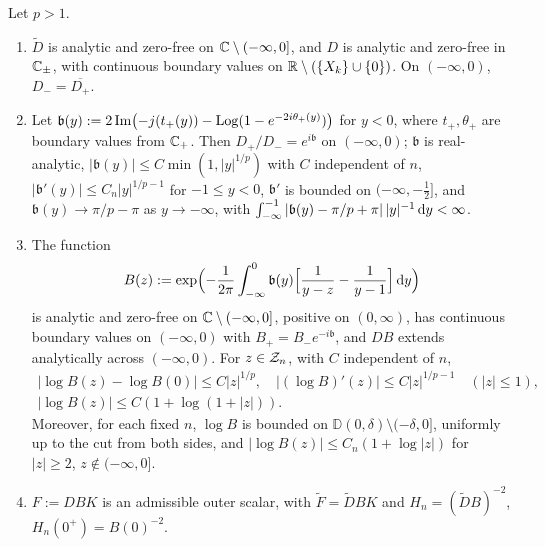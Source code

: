 \begin{lemma}\label{lem:binetcut}
Let $p>1$.
\begin{enumerate}
\item[(i)] $\tilde D$ is analytic and zero-free on $\mathbb{C}\setminus(-\infty,0]$, and $D$ is analytic and zero-free in
  $\mathbb{C}_\pm$, with continuous boundary values on $\mathbb{R}\setminus(\{X_k\}\cup\{0\})$. On $(-\infty,0)$, $D_-=\overline{D_+}$.
\item[(ii)] Let $\mathfrak b(y):=2\operatorname{Im}\bigl(-j(t_+(y))-\operatorname{Log}(1-e^{-2i\theta_+(y)})\bigr)$ for $y<0$, where $t_+,\theta_+$
  are boundary values from $\mathbb{C}_+$. Then $D_+/D_-=e^{i\mathfrak b}$ on $(-\infty,0)$; $\mathfrak b$ is real-analytic,
  $|\mathfrak b(y)|\le C\min(1,|y|^{1/p})$ with $C$ independent of $n$, $|\mathfrak b'(y)|\le C_n|y|^{1/p-1}$ for
  $-1\le y<0$, $\mathfrak b'$ is bounded on $(-\infty,-\frac12]$, and $\mathfrak b(y)\to\pi/p-\pi$ as $y\to-\infty$, with
  $\int_{-\infty}^{-1}|\mathfrak b(y)-\pi/p+\pi|\,|y|^{-1}\,\mathrm{d} y<\infty$.
\item[(iii)] The function
  \begin{equation}\label{eq:B}
    B(z):=\exp\Bigl(-\frac1{2\pi}\int_{-\infty}^0\mathfrak b(y)\Bigl[\frac1{y-z}-\frac1{y-1}\Bigr]\,\mathrm{d} y\Bigr)
  \end{equation}
  is analytic and zero-free on $\mathbb{C}\setminus(-\infty,0]$, positive on $(0,\infty)$, has continuous boundary values on
  $(-\infty,0)$ with $B_+=B_-e^{-i\mathfrak b}$, and $DB$ extends analytically across $(-\infty,0)$. For $z\in\mathcal{Z}_n$, with
  $C$ independent of $n$,
  \begin{equation}\label{eq:B-bounds}
  \begin{gathered}
    |\log B(z)-\log B(0)|\le C|z|^{1/p},\quad |(\log B)'(z)|\le C|z|^{1/p-1}\quad(|z|\le1),\\
    |\log B(z)|\le C(1+\log(1+|z|)).
  \end{gathered}
  \end{equation}
  Moreover, for each fixed $n$, $\log B$ is bounded on $\mathbb D(0,\delta)\setminus(-\delta,0]$, uniformly up to the cut
  from both sides, and $|\log B(z)|\le C_n(1+\log|z|)$ for $|z|\ge2$, $z\notin(-\infty,0]$.
\item[(iv)] $F:=DBK$ is an admissible outer scalar, with $\tilde F=\tilde DBK$ and $H_n=(\tilde DB)^{-2}$, $H_n(0^+)=B(0)^{-2}$.
\end{enumerate}
\end{lemma}

